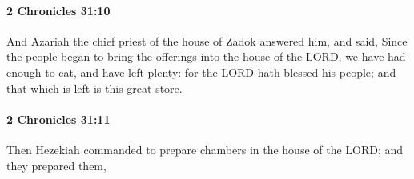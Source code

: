		\paragraph{2 Chronicles 31:10} %
			\label{2CHRONICLES-31-10}

			And Azariah the chief priest of the house of Zadok answered him, and said, Since the people began to bring the offerings into the house of the LORD, we have had enough to eat, and have left plenty: for the LORD hath blessed his people; and that which is left is this great store.


		\paragraph{2 Chronicles 31:11} %
			\label{2CHRONICLES-31-11}

			Then Hezekiah commanded to prepare chambers in the house of the LORD; and they prepared them,

